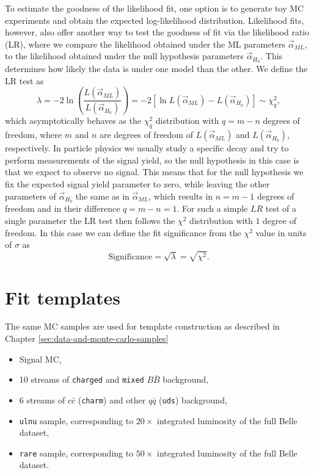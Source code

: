 \documentclass[headings=standardclasses,headings=big,oneside,a4paper,openany,12pt]{scrbook}
\begin{document}
To estimate the goodness of the likelihood fit, one option is to generate toy MC experiments and obtain the expected log-likelihood distribution. Likelihood fits, however, also offer another way to test the goodness of fit via the likelihood ratio (LR), where we compare the likelihood obtained under the ML parameters $\vec\alpha_{ML}$, to the likelihood obtained under the null hypothesis parameters $\vec\alpha_{H_0}$. This determines how likely the data is under one model than the other. We define the LR test as
\begin{equation}
\label{eq:lr}
\lambda = -2\ln\left(\frac{L(\vec \alpha_{ML})}{L(\vec \alpha_{H_0})}\right) = -2 \left[ \ln L(\vec \alpha_{ML}) - L(\vec \alpha_{H_0})\right] \sim \chi^2_q,
\end{equation}
which asymptotically behaves as the $\chi^2_q$ distribution with $q=m-n$ degrees of freedom, where $m$ and $n$ are degrees of freedom of $L(\vec \alpha_{ML})$ and $L(\vec \alpha_{H_0})$, respectively. In particle physics we usually study a specific decay and try to perform measurements of the signal yield, so the null hypothesis in this case is that we expect to observe no signal. This means that for the null hypothesis we fix the expected signal yield parameter to zero, while leaving the other parameters of $\vec\alpha_{H_0}$ the same as in $\vec\alpha_{ML}$, which results in $n = m-1$ degrees of freedom and in their difference $q = m -n = 1$. For such a simple $LR$ test of a single parameter the LR test then follows the $\chi^2$ distribution with $1$ degree of freedom. In this case we can define the fit significance from the $\chi^2$ value in units of $\sigma$ as
\begin{equation}
\mathrm{Significance} = \sqrt{\lambda} = \sqrt{\chi^2}.
\end{equation}

\section{Fit templates}

The same MC samples are used for template construction as described in Chapter \ref{sec:data-and-monte-carlo-samples}
\begin{itemize}
\item Signal MC,
\item 10 streams of \texttt{charged} and \texttt{mixed} $B \bar B$ background,
\item 6 streams of $c \bar c$ (\texttt{charm}) and other $q \bar q$ (\texttt{uds}) background,
\item \texttt{ulnu} sample, corresponding to $20\times$ integrated luminosity of the full Belle dataset,
\item \texttt{rare} sample, corresponding to $50\times$ integrated luminosity of the full Belle dataset.
\end{itemize}
\end{document}
